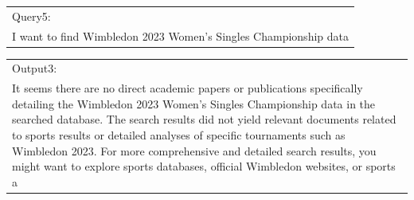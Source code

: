 \documentclass[12pt]{article}%
\begin{document}
\begin{table}[!ht]
\begin{tabular}{|p{17cm}|}
			\hline
		\end{tabular}
		
		\begin{tabular}{|p{17cm}|}
			\hline  \rowcolor{black!8}
			Query5:\\  \rowcolor{black!8}
			I want to find Wimbledon 2023 Women's Singles Championship data \\
			\hline
		\end{tabular}
		\begin{tabular}{|p{17cm}|}
			Output3:\\
			It seems there are no direct academic papers or publications specifically detailing the Wimbledon 2023 Women's Singles Championship data in the searched database. The search results did not yield relevant documents related to sports results or detailed analyses of specific tournaments such as Wimbledon 2023.
			For more comprehensive and detailed search results, you might want to explore sports databases, official Wimbledon websites, or sports a  \\
			
			\hline
		\end{tabular}
		
		
		
		
	\end{table}
	
	
	
	
	
\end{document}
